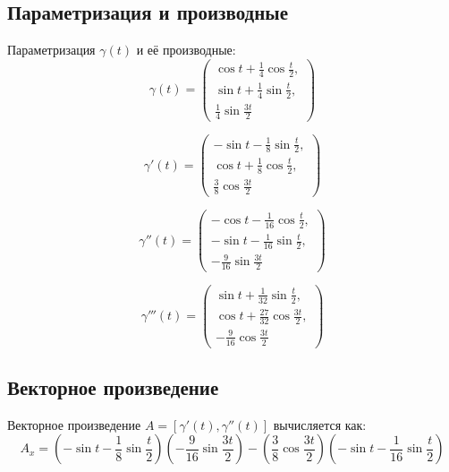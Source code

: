 \documentclass{article}
\begin{document}
        \subsection*{Параметризация и производные}
        Параметризация $\gamma(t)$ и её производные:
        \[
        \gamma(t) = \begin{pmatrix}
        \cos{t} + \frac{1}{4} \cos{\frac{t}{2}}, \\
        \sin{t} + \frac{1}{4} \sin{\frac{t}{2}}, \\
        \frac{1}{4} \sin{\frac{3t}{2}}
        \end{pmatrix}
        \]
        
        \[
        \gamma'(t) = \begin{pmatrix}
        -\sin{t} - \frac{1}{8} \sin{\frac{t}{2}}, \\
        \cos{t} + \frac{1}{8} \cos{\frac{t}{2}}, \\
        \frac{3}{8} \cos{\frac{3t}{2}}
        \end{pmatrix}
        \]
        
        \[
        \gamma''(t) = \begin{pmatrix}
        -\cos{t} - \frac{1}{16} \cos{\frac{t}{2}}, \\
        -\sin{t} - \frac{1}{16} \sin{\frac{t}{2}}, \\
        -\frac{9}{16} \sin{\frac{3t}{2}}
        \end{pmatrix}
        \]
        
        \[
        \gamma'''(t) = \begin{pmatrix}
        \sin{t} + \frac{1}{32} \sin{\frac{t}{2}}, \\
        \cos{t} + \frac{27}{32} \cos{\frac{3t}{2}}, \\
        -\frac{9}{16} \cos{\frac{3t}{2}}
        \end{pmatrix}
        \]
        
        \subsection*{Векторное произведение}
        Векторное произведение $A = [\gamma'(t), \gamma''(t)]$ вычисляется как:
        \[
        A_x = \left(-\sin{t} - \frac{1}{8} \sin{\frac{t}{2}}\right)
        \left(-\frac{9}{16} \sin{\frac{3t}{2}}\right) - 
        \left(\frac{3}{8} \cos{\frac{3t}{2}}\right)
        \left(-\sin{t} - \frac{1}{16} \sin{\frac{t}{2}}\right)
        \]
        
\end{document}
